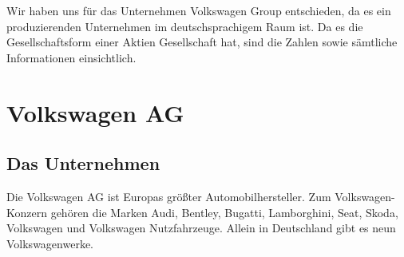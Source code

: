 \documentclass[12pt]{article}
\begin{document}
\newpage

\noindent
Wir haben uns für das Unternehmen Volkswagen Group entschieden, da es ein produzierenden Unternehmen im deutschsprachigem Raum ist. Da es die Gesellschaftsform einer Aktien Gesellschaft hat, sind die Zahlen sowie sämtliche Informationen einsichtlich. 
\section{Volkswagen AG}
\subsection{Das Unternehmen}
Die Volkswagen AG ist Europas größter Automobilhersteller. Zum Volkswagen-Konzern gehören die Marken Audi, Bentley, Bugatti, Lamborghini, Seat, Skoda, Volkswagen und Volkswagen Nutzfahrzeuge. Allein in Deutschland gibt es neun Volkswagenwerke.
\end{document}
